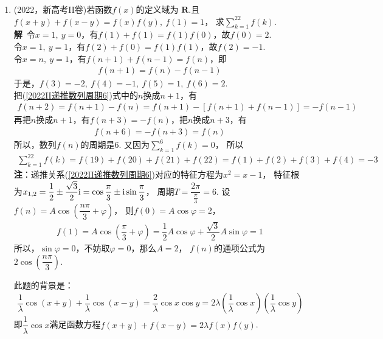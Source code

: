 \begin{enumerate}[label={【\textbf{例\thechapter.\arabic*}】},
 leftmargin=\inteval{\myenumleftmargin}pt,
 itemsep=\inteval{\myenumitempsep}pt,
 itemindent=\inteval{\myenumitemindent}pt]
\item (2022，新高考II卷)若函数$f(x)$的定义域为
$\mathbf{R}$.且$f(x+y)+f(x-y)=f(x)f(y),\ f(1)=1$，
求$\sum\limits_{k=1}^{22}f(k)$.\\
\textbf{解}\ 令$ x=1,\ y=0 $，有$ f(1)+f(1)=f(1)f(0) $，故$ f(0)=2 $. \\
令$ x=1,\ y=1 $，有$ f(2)+f(0)=f(1)f(1) $，故$ f(2)=-1 $. \\
令$ x=n,\ y=1 $，有$ f(n+1)+f(n-1)=f(n) $，即
\begin{gather}\label{2022II递推数列周期6}
    f(n+1)=f(n)-f(n-1)
\end{gather}
于是，$ f(3)=-2,\ f(4)=-1,\ f(5)=1,\ f(6)=2 $. \\
把(\ref{2022II递推数列周期6})式中的$ n $换成$ n+1 $，有
\begin{gather*}
    f(n+2)=f(n+1)-f(n)=f(n+1)-[f(n+1)+f(n-1)]=-f(n-1)
\end{gather*}
再把$ n $换成$ n+1 $，有$ f(n+3)=-f(n) $，把$ n $换成$ n+3 $，有
\begin{gather*}
    f(n+6)=-f(n+3)=f(n)
\end{gather*}
所以，数列$ f(n) $的周期是6. 又因为$ \sum\limits_{k=1}^{6}f(k)=0 $，
所以
\begin{gather*}
    \sum\limits_{k=1}^{22}f(k)=f(19)+f(20)+f(21)+f(22)=
    f(1)+f(2)+f(3)+f(4)=-3
\end{gather*}
\textbf{注}：递推关系(\ref{2022II递推数列周期6})对应的特征方程为$ x^2=x-1 $，
特征根为$ x_{1,2}=\dfrac{1}{2}\pm \dfrac{\sqrt{3}}{2}\mathrm{i}=
\cos\dfrac{\pi}{3}\pm \mathrm{i}\sin\dfrac{\pi}{3} $，
周期$ T=\dfrac{2\pi}{\frac{\pi}{3}}=6 $. 
设$ f(n)=A\cos\left(\dfrac{n\pi}{3}+\varphi\right) $，
则$ f(0)=A\cos\varphi=2 $，
\begin{gather*}
    f(1)=A\cos\left(\dfrac{\pi}{3}+\varphi\right)=
    \dfrac{1}{2}A\cos\varphi+\dfrac{\sqrt{3}}{2}A\sin\varphi=1
\end{gather*}
所以，$ \sin\varphi=0 $，不妨取$ \varphi=0 $，那么$ A=2 $，
$ f(n) $的通项公式为$ 2\cos\left(\dfrac{n\pi}{3}\right) $. 

此题的背景是：
\begin{gather*}
    \dfrac{1}{\lambda}\cos(x+y)+\dfrac{1}{\lambda}\cos(x-y)=
    \dfrac{2}{\lambda}\cos x\cos y=
    2\lambda\left(\dfrac{1}{\lambda}\cos x\right)
    \left(\dfrac{1}{\lambda}\cos y\right)
\end{gather*}
即$ \dfrac{1}{\lambda}\cos x $满足函数方程$ f(x+y)+f(x-y)=2\lambda f(x)f(y) $. 


\end{enumerate}
